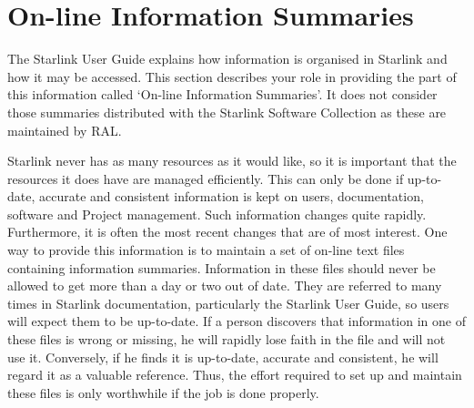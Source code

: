 \section {On-line Information Summaries}

The Starlink User Guide explains how information is organised in Starlink and
how it may be accessed.
This section describes your role in providing the part of this information
called `On-line Information Summaries'.
It does not consider those summaries distributed with the Starlink Software
Collection as these are maintained by RAL.

Starlink never has as many resources as it would like, so it is important that
the resources it does have are managed efficiently.
This can only be done if up-to-date, accurate and consistent information is
kept on users, documentation, software and Project management.
Such information changes quite rapidly.
Furthermore, it is often the most recent changes that are of most interest.
One way to provide this information is to maintain a set of on-line text
files containing information summaries.
Information in these files should never be allowed to get more than a day or
two out of date.
They are referred to many times in Starlink documentation, particularly the
Starlink User Guide, so users will expect them to be up-to-date.
If a person discovers that information in one of these files is wrong or
missing, he will rapidly lose faith in the file and will not use it.
Conversely, if he finds it is up-to-date, accurate and consistent, he will
regard it as a valuable reference.
Thus, the effort required to set up and maintain these files is only
worthwhile if the job is done properly.

